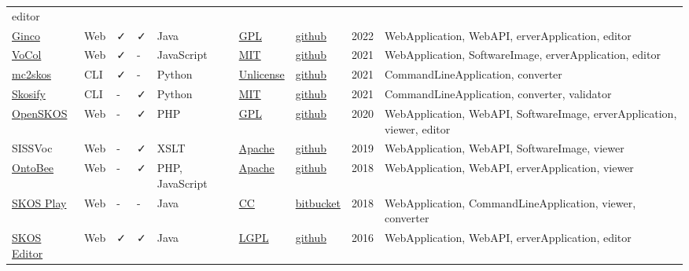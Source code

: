 \documentclass[
  DIV=10]{article}
\begin{document}
\begin{longtable}[]{@{}lllllllll@{}}
editor \\
\href{http://culturecommunication.github.io/ginco/}{Ginco} & Web & ✓ & ✓
& Java & \href{https://spdx.org/licenses/GPL-3.0-or-later}{GPL} &
\href{https://github.com/culturecommunication/ginco}{github} & 2022 &
WebApplication, WebAPI, erverApplication, editor \\
\href{https://www.vocoreg.com/}{VoCol} & Web & ✓ & - & JavaScript &
\href{https://spdx.org/licenses/MIT}{MIT} &
\href{https://github.com/vocol/vocol}{github} & 2021 & WebApplication,
SoftwareImage, erverApplication, editor \\
\href{https://github.com/scriptotek/mc2skos}{mc2skos} & CLI & ✓ & - &
Python & \href{https://spdx.org/licenses/Unlicense}{Unlicense} &
\href{https://github.com/scriptotek/mc2skos}{github} & 2021 &
CommandLineApplication, converter \\
\href{https://skosify.readthedocs.io/en/latest/}{Skosify} & CLI & - & ✓
& Python & \href{https://spdx.org/licenses/MIT}{MIT} &
\href{https://github.com/NatLibFi/Skosify}{github} & 2021 &
CommandLineApplication, converter, validator \\
\href{http://openskos.org/}{OpenSKOS} & Web & - & ✓ & PHP &
\href{https://spdx.org/licenses/GPL-3.0-or-later}{GPL} &
\href{https://github.com/OpenSKOS/OpenSKOS}{github} & 2020 &
WebApplication, WebAPI, SoftwareImage, erverApplication, viewer,
editor \\
SISSVoc & Web & - & ✓ & XSLT &
\href{https://spdx.org/licenses/Apache-2.0}{Apache} &
\href{https://github.com/SISS/sissvoc}{github} & 2019 & WebApplication,
WebAPI, SoftwareImage, viewer \\
\href{https://ontobee.org/}{OntoBee} & Web & - & ✓ & PHP, JavaScript &
\href{https://spdx.org/licenses/Apache-2.0}{Apache} &
\href{https://github.com/OntoZoo/ontobee}{github} & 2018 &
WebApplication, WebAPI, erverApplication, viewer \\
\href{https://skos-play.sparna.fr/play/about}{SKOS Play} & Web & - & - &
Java & \href{https://spdx.org/licenses/CC-BY-SA-4.0}{CC} &
\href{https://bitbucket.org/tfrancart/sparna/src/master/}{bitbucket} &
2018 & WebApplication, CommandLineApplication, viewer, converter \\
\href{https://jbiomedsem.biomedcentral.com/articles/10.1186/s13326-015-0043-z}{SKOS
Editor} & Web & ✓ & ✓ & Java &
\href{https://spdx.org/licenses/LGPL-3.0-or-later}{LGPL} &
\href{https://github.com/Blulab-Utah/SKOSEditor}{github} & 2016 &
WebApplication, WebAPI, erverApplication, editor \\

\end{longtable}
\end{document}
